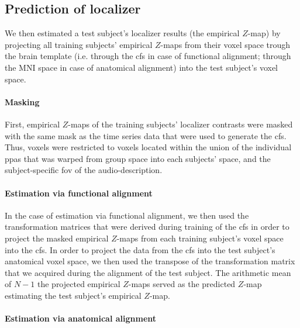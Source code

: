 \subsection{Prediction of localizer}


We then estimated a test subject's localizer results (the empirical $Z$-map) by
projecting all training subjects' empirical $Z$-maps from their voxel space
trough the brain template  (i.e. through the \ac{cfs} in case of functional
alignment; through the MNI space in case of anatomical alignment) into the test
subject's voxel space.


\paragraph{Masking}
%
First, empirical $Z$-maps of the training subjects' localizer contrasts were
masked with the same mask as the time series data that were used to generate the
\ac{cfs}.
%
Thus, voxels were restricted to voxels located within the union of the
individual \acp{ppa} \citep[s.][]{haeusler2022processing} that was warped from
group space into each subjects' space, and the subject-specific \ac{fov} of the
audio-description.


\paragraph{Estimation via functional alignment}
In the case of estimation via functional alignment, we then used the
transformation matrices that were derived during training of the \ac{cfs} in
order to project the masked empirical $Z$-maps from each training subject's
voxel space into the \ac{cfs}.
In order to project the data from the \ac{cfs} into the test subject's
anatomical voxel space, we then used the transpose of the transformation matrix
that we acquired during the alignment of the test subject.
The arithmetic mean of $N-1$ the projected empirical $Z$-maps served as the
predicted $Z$-map estimating the test subject's empirical $Z$-map.


\paragraph{Estimation via anatomical alignment}

